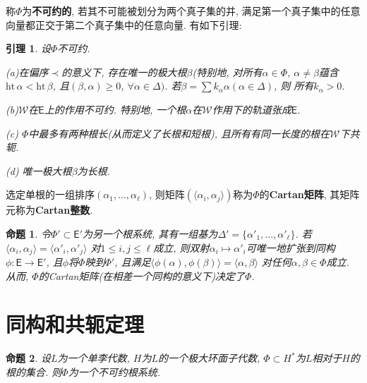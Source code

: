 \documentclass{ctexart}%
\newtheorem{lemma}{引理}
\newtheorem{proposition}{命题}
\theoremstyle{definition}
\theoremstyle{remark}
\begin{document}
称$\Phi$为\textbf{不可约的}, 若其不可能被划分为两个真子集的并, 满足第一个真子集中的任意向量都正交于第二个真子集中的任意向量. 有如下引理:
\begin{lemma}\label{10.4}
设$\Phi$不可约.

(a)在偏序$\prec$的意义下, 存在唯一的极大根$\beta$(特别地, 对所有$\alpha\in\Phi$, $\alpha\neq \beta$蕴含$\mathrm{ht}\,\alpha < \mathrm{ht}\,\beta$, 且$(\beta,\alpha)\geq 0$, $\forall \alpha \in \Delta)$. 若$\beta=\sum k_\alpha \alpha (\alpha\in \Delta)$, 则 所有$k_\alpha>0$.

(b)$\mathscr{W}$在$\mathsf{E}$上的作用不可约. 特别地, 一个根$\alpha$在$\mathscr{W}$作用下的轨道张成$\mathsf{E}$.

(c) $\Phi$中最多有两种根长(从而定义了长根和短根), 且所有有同一长度的根在$\mathscr{W}$下共轭.

(d) 唯一极大根$\beta$为长根.
\end{lemma}

选定单根的一组排序$(\alpha_1,...,\alpha_\ell)$, 则矩阵$(\langle \alpha_i,\alpha_j\rangle)$称为$\Phi$的\textbf{Cartan矩阵}, 其矩阵元称为\textbf{Cartan整数}.

\begin{proposition} 令$\Phi'\subset \mathsf{E}'$为另一个根系统, 其有一组基为$\Delta'=\{\alpha'_1,...,\alpha'_\ell\}$. 若$\langle \alpha_i,\alpha_j\rangle = \langle \alpha'_i,\alpha'_j\rangle$ 对$1\leq i,j\leq \ell$成立, 则双射$\alpha_i\mapsto \alpha'_i$可唯一地扩张到同构$\phi\colon\mathsf{E}\rightarrow\mathsf{E}'$, 且$\phi$将$\Phi$映到$\Phi'$, 且满足$\langle \phi(\alpha),\phi(\beta)\rangle = \langle \alpha,\beta\rangle$ 对任何$\alpha,\beta\in \Phi$成立. 从而, $\Phi$的Cartan矩阵(在相差一个同构的意义下)决定了$\Phi$.
\end{proposition}











\section{同构和共轭定理}

\begin{proposition} 设$L$为一个单李代数, $H$为$L$的一个极大环面子代数, $\Phi\subset H^*$为$L$相对于$H$的根的集合. 则$\Phi$为一个不可约根系统.
\end{proposition}
\end{document}
